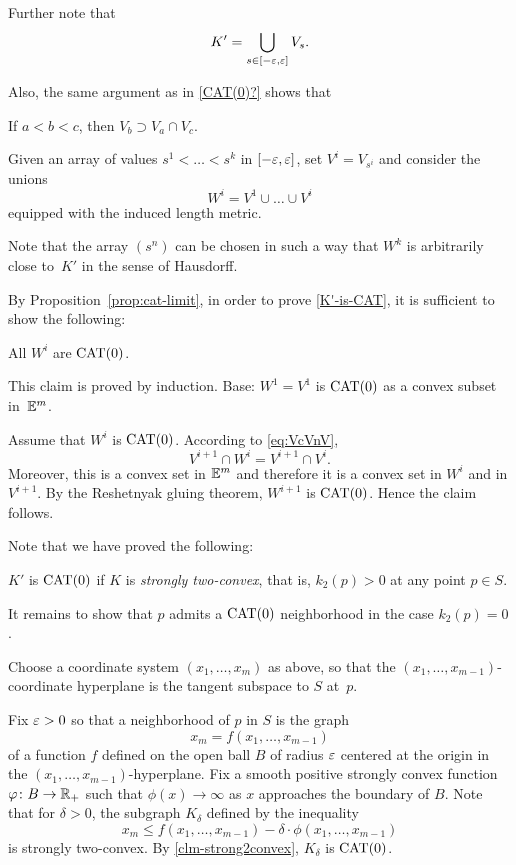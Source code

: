 Further note that 
\[K'=\bigcup_{s\in[-\varepsilon,\varepsilon]}V_s.\]

Also, the same argument as in \ref{CAT(0)?} shows that
\begin{clm}{}\label{eq:VcVnV}
If $a<b<c$, then $V_b\supset V_a\cap V_c$.

\end{clm}

Given an array of values $s^1<\dots<s^k$ in $[-\varepsilon,\varepsilon]$,
set $V^i=V_{s^i}$ and
consider the unions 
\[W^i=V^1\cup\dots\cup V^i\]
equipped with the induced length metric.

Note that the array $(s^n)$ can be chosen in such a way that 
$W^k$ is arbitrarily close to~$K'$ in the sense of Hausdorff.

By Proposition~\ref{prop:cat-limit}, 
in order to prove \ref{K'-is-CAT}, 
it is sufficient to show the following:
\begin{clm}{}
All $W^i$ are $\mathrm{CAT}(0)$.
\end{clm}

This claim is proved by induction.
Base: $W^1=V^1$ is $\mathrm{CAT}(0)$ as a convex subset in~$\mathbb{E}^m$.

 Assume that $W^i$ is $\mathrm{CAT}(0)$.
According to \ref{eq:VcVnV}, 
\[V^{i+1}\cap W^i=V^{i+1}\cap V^i.\] 
Moreover, this is a convex set in $\mathbb{E}^m$ 
and therefore it is a convex set in $W^i$ and in $V^{i+1}$.
By the Reshetnyak gluing theorem, $W^{i+1}$ is $\mathrm{CAT}(0)$.
Hence the claim follows.
\claimqeds

Note that we have  proved the following:
\begin{clm}{}\label{clm-strong2convex}
$K'$ is $\mathrm{CAT}(0)$ if $K$ is 
\emph{strongly two-convex},
that is, $k_2(p)>0$ at any point $p\in S$.
\end{clm}


It remains to show that $p$ admits a $\mathrm{CAT}(0)$ neighborhood in the case $k_2(p)=0$.

Choose a coordinate system $(x_1,\dots,x_m)$ as above,
so that the $(x_1,\dots,x_{m-1})$-coordinate hyperplane is the tangent subspace to $S$ at~$p$.

Fix $\varepsilon>0$ so that a neighborhood of $p$ in $S$ 
is the graph
\[x_m= f(x_1,\dots,x_{m-1})\]
of a function $f$ defined on the open ball $B$ of radius $\varepsilon$  centered at the origin in the $(x_1,\dots,x_{m-1})$-hyperplane.
Fix a smooth positive 
strongly 
convex function $\varphi\colon B\to \mathbb{R}_+$
such that $\phi(x)\to\infty$ as $x$ approaches the boundary of $B$.
Note that for $\delta>0$, the subgraph $K_\delta$ defined by the inequality
\[x_m\le f(x_1,\dots,x_{m-1})-\delta\cdot\phi(x_1,\dots,x_{m-1})\]
is strongly two-convex.
By \ref{clm-strong2convex}, $K_\delta$ is $\mathrm{CAT}(0)$.

